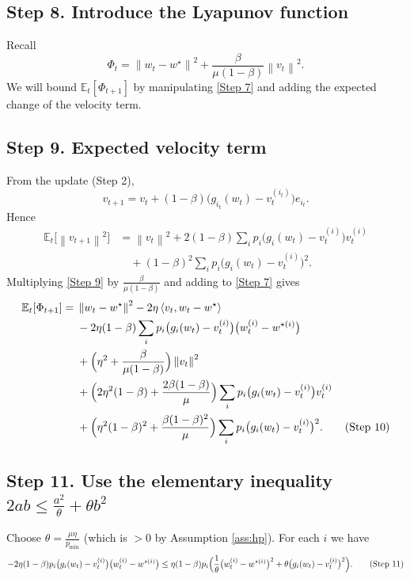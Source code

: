 \documentclass{article}
\newcommand{\E}{\mathbb{E}}
\newcommand{\norm}[1]{\left\|#1\right\|}
\newcommand{\ip}[2]{\left\langle #1,#2\right\rangle}
\begin{document}
\subsection*{Step 8.  Introduce the Lyapunov function}
Recall
\[
\Phi_t=\norm{w_t-w^{\star}}^{2}+\frac{\beta}{\mu(1-\beta)}\norm{v_t}^{2}.
\]
We will bound $\E_t[\Phi_{t+1}]$ by manipulating \eqref{Step 7} and adding the expected change of the velocity term.

\subsection*{Step 9.  Expected velocity term}
From the update (Step 2),
\[
v_{t+1}=v_t+(1-\beta)\bigl(g_{i_t}(w_t)-v_t^{(i_t)}\bigr)e_{i_t}.
\]
Hence
\begin{align}
\E_t\!\bigl[\norm{v_{t+1}}^{2}\bigr]
&= \norm{v_t}^{2}
+2(1-\beta)\sum_{i}p_i\bigl(g_i(w_t)-v_t^{(i)}\bigr)v_t^{(i)} \nonumber\\
&\quad+(1-\beta)^{2}\sum_{i}p_i\bigl(g_i(w_t)-v_t^{(i)}\bigr)^{2}.
\tag{Step 9}
\end{align}
Multiplying \eqref{Step 9} by $\frac{\beta}{\mu(1-\beta)}$ and adding to \eqref{Step 7} gives
\begin{align}
\E_t[\Phi_{t+1}]
=&\;\norm{w_t-w^{\star}}^{2}
-2\eta\ip{v_t}{w_t-w^{\star}} \nonumber\\
&\; -2\eta(1-\beta)\sum_{i}p_i\bigl(g_i(w_t)-v_t^{(i)}\bigr)
\bigl(w_t^{(i)}-w^{\star (i)}\bigr) \nonumber\\
&\; +\Bigl(\eta^{2}+\frac{\beta}{\mu(1-\beta)}\Bigr)\norm{v_t}^{2} \nonumber\\
&\; +\Bigl(2\eta^{2}(1-\beta)+\frac{2\beta(1-\beta)}{\mu}\Bigr)
\sum_{i}p_i\bigl(g_i(w_t)-v_t^{(i)}\bigr)v_t^{(i)} \nonumber\\
&\; +\Bigl(\eta^{2}(1-\beta)^{2}+\frac{\beta(1-\beta)^{2}}{\mu}\Bigr)
\sum_{i}p_i\bigl(g_i(w_t)-v_t^{(i)}\bigr)^{2}.
\tag{Step 10}
\end{align}

\subsection*{Step 11.  Use the elementary inequality $2ab\le \frac{a^{2}}{\theta}+ \theta b^{2}$}
Choose $\theta=\frac{\mu\eta}{p_{\min}}$ (which is $>0$ by Assumption \ref{ass:hp}).  
For each $i$ we have
\[
-2\eta(1-\beta)p_i\bigl(g_i(w_t)-v_t^{(i)}\bigr)
\bigl(w_t^{(i)}-w^{\star (i)}\bigr)
\le
\eta(1-\beta)p_i\Bigl(\frac{1}{\theta}\bigl(w_t^{(i)}-w^{\star (i)}\bigr)^{2}
+\theta\bigl(g_i(w_t)-v_t^{(i)}\bigr)^{2}\Bigr).
\tag{Step 11}
\]
\end{document}
